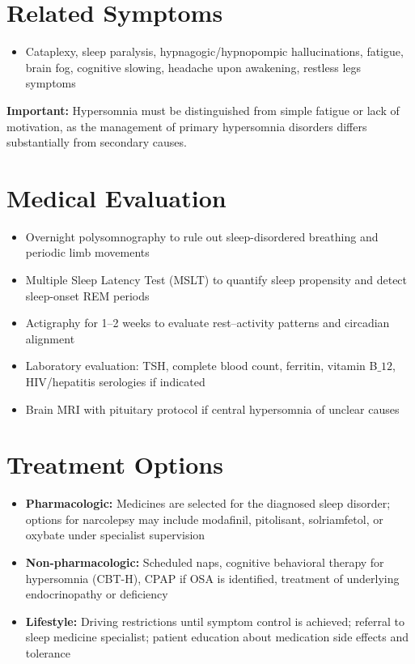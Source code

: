 \section*{Related Symptoms}
\begin{itemize}
  \item Cataplexy, sleep paralysis, hypnagogic/hypnopompic hallucinations, fatigue, brain fog, cognitive slowing, headache upon awakening, restless legs symptoms
\end{itemize}
\textbf{Important:} Hypersomnia must be distinguished from simple fatigue or lack of motivation, as the management of primary hypersomnia disorders differs substantially from secondary causes.

\section*{Medical Evaluation}
\begin{itemize}
  \item Overnight polysomnography to rule out sleep-disordered breathing and periodic limb movements
  \item Multiple Sleep Latency Test (MSLT) to quantify sleep propensity and detect sleep-onset REM periods
  \item Actigraphy for 1--2 weeks to evaluate rest--activity patterns and circadian alignment
  \item Laboratory evaluation: TSH, complete blood count, ferritin, vitamin B\(\_{12}\), HIV/hepatitis serologies if indicated
  \item Brain MRI with pituitary protocol if central hypersomnia of unclear causes
\end{itemize}

\section*{Treatment Options}
\begin{itemize}
  \item \textbf{Pharmacologic:} Medicines are selected for the diagnosed sleep disorder; options for narcolepsy may include modafinil, pitolisant, solriamfetol, or oxybate under specialist supervision
  \item \textbf{Non-pharmacologic:} Scheduled naps, cognitive behavioral therapy for hypersomnia (CBT-H), CPAP if OSA is identified, treatment of underlying endocrinopathy or deficiency
  \item \textbf{Lifestyle:} Driving restrictions until symptom control is achieved; referral to sleep medicine specialist; patient education about medication side effects and tolerance
\end{itemize}

